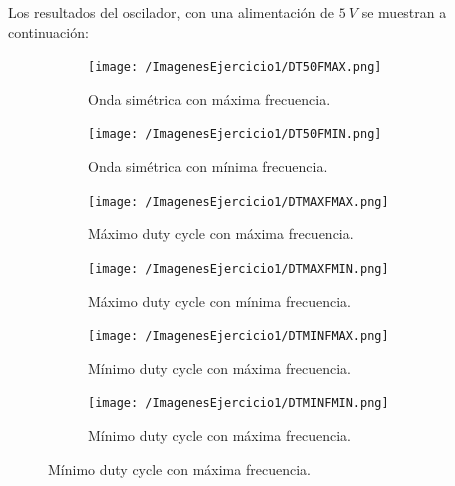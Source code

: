 Los resultados del oscilador, con una alimentación de $5 \ V$ se muestran a continuación:
\begin{figure}
\centering
\begin{subfigure}[b]{.49\linewidth}
\texttt{[image: /ImagenesEjercicio1/DT50FMAX.png]}
\caption{Onda simétrica con máxima frecuencia.}
\end{subfigure}
\begin{subfigure}[b]{.49\linewidth}
\texttt{[image: /ImagenesEjercicio1/DT50FMIN.png]}
\caption{Onda simétrica con mínima frecuencia.}
\end{subfigure}

\begin{subfigure}[b]{.49\linewidth}
\texttt{[image: /ImagenesEjercicio1/DTMAXFMAX.png]}
\caption{Máximo duty cycle con máxima frecuencia.}
\end{subfigure}
\begin{subfigure}[b]{.49\linewidth}
\texttt{[image: /ImagenesEjercicio1/DTMAXFMIN.png]}
\caption{Máximo duty cycle con mínima frecuencia.}
\end{subfigure}

\begin{subfigure}[b]{.49\linewidth}
\texttt{[image: /ImagenesEjercicio1/DTMINFMAX.png]}
\caption{Mínimo duty cycle con máxima frecuencia.}
\end{subfigure}
\begin{subfigure}[b]{.49\linewidth}
\texttt{[image: /ImagenesEjercicio1/DTMINFMIN.png]}
\caption{Mínimo duty cycle con máxima frecuencia.}
\end{subfigure}

\end{figure}

